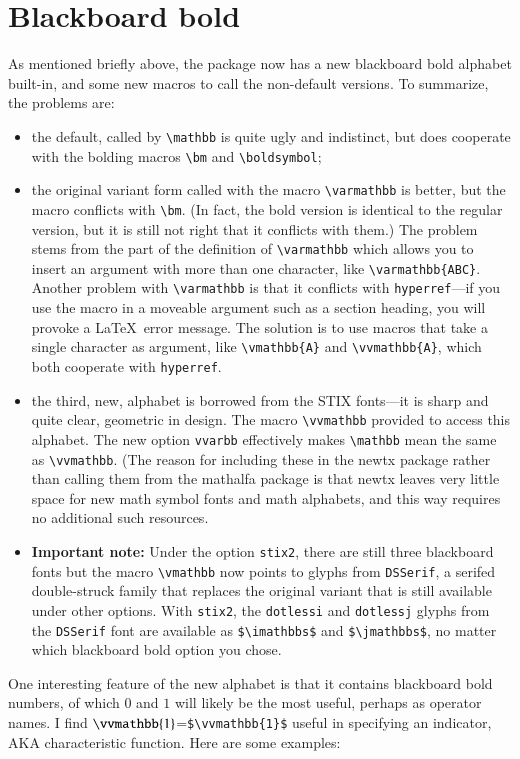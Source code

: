 \documentclass[11pt]{article}
\theoremstyle{oldplain}
\theoremstyle{plain}
\begin{document}
\section{Blackboard bold}
As mentioned briefly above, the package now has a new blackboard bold alphabet built-in, and some new macros to call the non-default versions. To summarize, the problems are:
\begin{itemize}
\item
the default, called by \verb|\mathbb| is quite ugly and indistinct, but does cooperate with the bolding macros \verb|\bm| and \verb|\boldsymbol|;
\item the original variant form called with the macro \verb|\varmathbb| is better, but the macro conflicts with \verb|\bm|. (In fact, the bold version is identical to the regular version, but it is still not right that it conflicts with them.) The problem stems from the part of the definition of \verb|\varmathbb| which allows you to insert an argument with more than one character, like \verb|\varmathbb{ABC}|. Another problem with \verb|\varmathbb| is that it conflicts with {\tt hyperref}---if you use the macro in a moveable argument such as a section heading, you will provoke a \LaTeX\ error message. The solution is to use macros that take a single character as argument, like \verb|\vmathbb{A}| and \verb|\vvmathbb{A}|, which both cooperate with {\tt hyperref}.
\item the third, new, alphabet is borrowed from the STIX fonts---it is sharp and quite clear, geometric in design.  The macro \verb|\vvmathbb| provided to access this alphabet. The new option {\tt vvarbb} effectively makes \verb|\mathbb| mean the same as \verb|\vvmathbb|.
(The reason for including these in the \textsf{newtx} package rather than calling them from the \textsf{mathalfa} package is that \textsf{newtx} leaves very little space for new math symbol fonts and math alphabets, and this way requires no additional such resources.
\item \textbf{Important note:} Under the option {\tt stix2}, there are still three blackboard fonts but the macro \verb|\vmathbb| now points to glyphs from {\tt DSSerif}, a serifed double-struck family that replaces the original variant that is still available under other options. With {\tt stix2}, the {\tt dotlessi} and {\tt dotlessj} glyphs from the {\tt DSSerif} font are available as \verb|$\imathbbs$| and \verb|$\jmathbbs$|, no matter which blackboard bold option you chose.
\end{itemize}
One interesting feature of the new alphabet is that it contains blackboard bold numbers, of which $0$ and $1$ will likely be the most useful, perhaps as operator names. I find $\vvmathbb{1}$=\verb|$\vvmathbb{1}$| useful in specifying an indicator, AKA characteristic function. Here are some examples:
\end{document}
